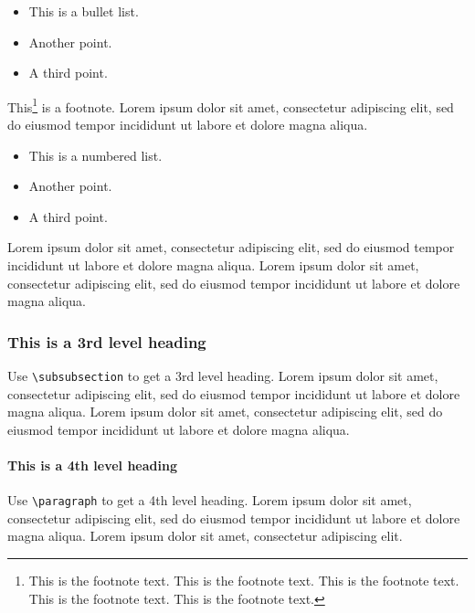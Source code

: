 \documentclass[a4paper,num-refs]{oup-contemporary}
\begin{document}
\begin{itemize}
\item This is a bullet list.
\item Another point.
\item A third point.
\end{itemize}

This\footnote{This is the footnote text. This is the footnote text. This is the footnote text. This is the footnote text. This is the footnote text.} is a footnote. Lorem ipsum dolor sit amet, consectetur adipiscing elit, sed do eiusmod tempor incididunt ut labore et dolore magna aliqua.

\begin{itemize}
\item This is a numbered list.
\item Another point.
\item A third point.
\end{itemize}

Lorem ipsum dolor sit amet, consectetur adipiscing elit, sed do eiusmod tempor incididunt ut labore et dolore magna aliqua. Lorem ipsum dolor sit amet, consectetur adipiscing elit, sed do eiusmod tempor incididunt ut labore et dolore magna aliqua.


\subsubsection{This is a 3rd level heading}

Use \verb|\subsubsection| to get a 3rd level heading.
Lorem ipsum dolor sit amet, consectetur adipiscing elit, sed do eiusmod tempor incididunt ut labore et dolore magna aliqua. Lorem ipsum dolor sit amet, consectetur adipiscing elit, sed do eiusmod tempor incididunt ut labore et dolore magna aliqua.


\paragraph{This is a 4th level heading}

Use \verb|\paragraph| to get a 4th level heading.
Lorem ipsum dolor sit amet, consectetur adipiscing elit, sed do eiusmod tempor incididunt ut labore et dolore magna aliqua. Lorem ipsum dolor sit amet, consectetur adipiscing elit.
\end{document}
